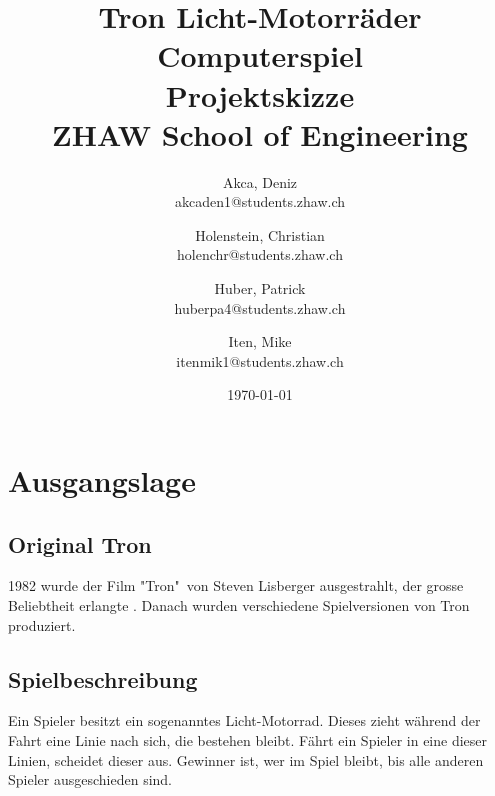 \documentclass[11pt,ngerman]{article}
\begin{document}
    \title{Tron Licht-Motorräder Computerspiel\\
        \vspace{1cm}
        \smaller{}Projektskizze \\
        \vspace{0.5cm}
        \small{}ZHAW  School of Engineering
        \vspace{1.5cm}
    }
    \author{
        Akca, Deniz\\
        \small{akcaden1@students.zhaw.ch}
        \and
        Holenstein, Christian\\
        \small{holenchr@students.zhaw.ch}
        \and
        Huber, Patrick\\
        \small{huberpa4@students.zhaw.ch}
        \and
        Iten, Mike\\
        \small{itenmik1@students.zhaw.ch}
        \vspace{1.5cm}
    }
   \date{\today}

    \maketitle
    \newpage

    \tableofcontents
    \newpage

    \section{Ausgangslage}

    \subsection{Original Tron}
    1982 wurde der Film "Tron"\ von Steven Lisberger ausgestrahlt, der grosse Beliebtheit erlangte \cite{lisbergerTRON1982}\cite{TronFilm2020}. Danach wurden verschiedene Spielversionen von Tron produziert.

    \subsection{Spielbeschreibung}
    Ein Spieler besitzt ein sogenanntes Licht-Motorrad. Dieses zieht während der Fahrt eine Linie nach sich, die bestehen bleibt. Fährt ein Spieler in eine dieser Linien, scheidet dieser aus. Gewinner ist, wer im Spiel bleibt, bis alle anderen Spieler ausgeschieden sind.
\end{document}

